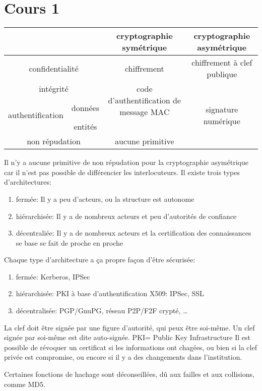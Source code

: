 \section{Cours 1}
\hspace*{-3cm}\begin{tabular}{|c|c|c|c|}
\hline
\multicolumn{2}{|c|}{ } & cryptographie sym\'etrique & cryptographie asym\'etrique\\
\hline
\multicolumn{2}{|c|}{confidentialit\'e} & chiffrement & chiffrement \`a clef publique\\
\hline
\multicolumn{2}{|c|}{int\'egrit\'e} & \multirow{2}{3.5cm}{code d'authentification de message MAC} &
\multirow{4}{2cm}{signature num\'erique}\\
\cline{1-2}
\multirow{2}{4cm}{authentification} & donn\'ees & & \\
\cline{2-2}
 & entit\'es & & \\
\cline{1-3}
\multicolumn{2}{|c|}{non r\'epudation} & aucune primitive & \\
\hline
\end{tabular}
Il n'y a aucune primitive de non r\'epudation pour la cryptographie asym\'etrique car il n'est pas possible de
diff\'erencier les interlocuteurs.
\medskip
Il existe trois types d'architectures:
\begin{enumerate}
  \item ferm\'ee: Il y a peu d'acteurs, ou la structure est autonome
  \item hi\'erarchis\'ee: Il y a de nombreux acteurs et peu d'autorit\'es de confiance
  \item d\'ecentrali\'ee: Il y a de nombreux acteurs et la certification des connaissances se base se fait de
  proche en proche
\end{enumerate}

Chaque type d'architecture a \c ca propre fa\c con d'\^etre s\'ecuris\'ee:
\begin{enumerate}
  \item ferm\'ee: Kerberos, IPSec
  \item hi\'erarchis\'ee: PKI \`a base d'authentification X509: IPSec, SSL
  \item d\'ecentralis\'ee: PGP/GnuPG, r\'eseau P2P/F2F crypt\'e, \dots
\end{enumerate}
\medskip
La clef doit \^etre sign\'ee par une figure d'autorit\'e, qui peux \^etre soi-m\^eme. Un clef sign\'ee par soi-m\^eme
est dite auto-sign\'ee.
\smallskip
PKI= Public Key Infrastructure
\smallskip
Il est possible de r\'evoquer un certificat si les informations ont chag\'ees, ou bien si la clef priv\'ee est
compromise, ou encore si il y a des changements dans l'institution.

Certaines fonctions de hachage sont d\'econseill\'ees, d\^u aux failles et aux collisions, comme MD5.
